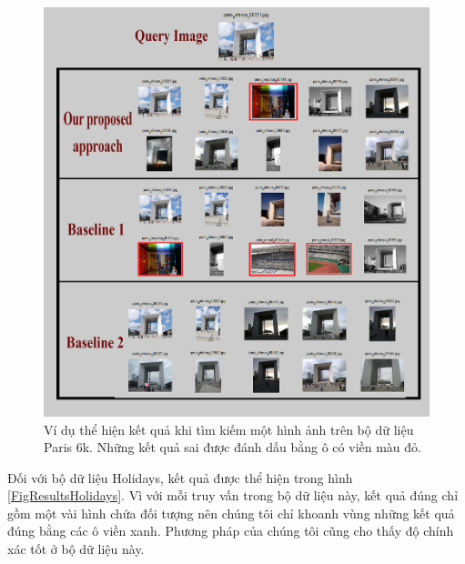 \begin{figure}[!htbp]
\begin{center}
      \includegraphics[scale=0.2]{resParis6k}
    \fi
    \caption[Ví dụ thể hiện kết quả khi tìm kiếm một hình ảnh trên bộ dữ liệu Paris 6k]{Ví dụ thể hiện kết quả khi tìm kiếm một hình ảnh trên bộ dữ liệu Paris 6k. Những kết quả sai được đánh dấu bằng ô có viền màu đỏ.}
    \label{FigResultsParis}
  \end{center}
\end{figure}

Đối với bộ dữ liệu Holidays, kết quả được thể hiện trong hình \ref{FigResultsHolidays}. Vì với mỗi truy vấn trong bộ dữ liệu này, kết quả đúng chỉ gồm một vài hình chứa đối tượng nên chúng tôi chỉ khoanh vùng những kết quả đúng bằng các ô viền xanh. Phương pháp của chúng tôi cũng cho thấy độ chính xác tốt ở bộ dữ liệu này.

